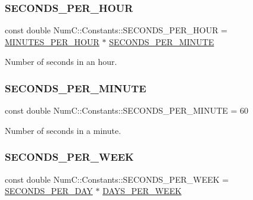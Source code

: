\subsubsection{\texorpdfstring{S\+E\+C\+O\+N\+D\+S\+\_\+\+P\+E\+R\+\_\+\+H\+O\+UR}{SECONDS\_PER\_HOUR}}
{\footnotesize\ttfamily const double Num\+C\+::\+Constants\+::\+S\+E\+C\+O\+N\+D\+S\+\_\+\+P\+E\+R\+\_\+\+H\+O\+UR = \mbox{\hyperlink{namespace_num_c_1_1_constants_ad866f0ac14005c8c3e2a09f396a3aab3}{M\+I\+N\+U\+T\+E\+S\+\_\+\+P\+E\+R\+\_\+\+H\+O\+UR}} $\ast$ \mbox{\hyperlink{namespace_num_c_1_1_constants_af8489b57825b7d3355fd0e3da0e4ad62}{S\+E\+C\+O\+N\+D\+S\+\_\+\+P\+E\+R\+\_\+\+M\+I\+N\+U\+TE}}}



Number of seconds in an hour. 

\mbox{\label{namespace_num_c_1_1_constants_af8489b57825b7d3355fd0e3da0e4ad62}} 
\subsubsection{\texorpdfstring{S\+E\+C\+O\+N\+D\+S\+\_\+\+P\+E\+R\+\_\+\+M\+I\+N\+U\+TE}{SECONDS\_PER\_MINUTE}}
{\footnotesize\ttfamily const double Num\+C\+::\+Constants\+::\+S\+E\+C\+O\+N\+D\+S\+\_\+\+P\+E\+R\+\_\+\+M\+I\+N\+U\+TE = 60}



Number of seconds in a minute. 

\mbox{\label{namespace_num_c_1_1_constants_abb1ba6ca939e4a4872c904e9cb624300}} 
\subsubsection{\texorpdfstring{S\+E\+C\+O\+N\+D\+S\+\_\+\+P\+E\+R\+\_\+\+W\+E\+EK}{SECONDS\_PER\_WEEK}}
{\footnotesize\ttfamily const double Num\+C\+::\+Constants\+::\+S\+E\+C\+O\+N\+D\+S\+\_\+\+P\+E\+R\+\_\+\+W\+E\+EK = \mbox{\hyperlink{namespace_num_c_1_1_constants_a0679151e1b64bb3d5a0d005893a4fe3e}{S\+E\+C\+O\+N\+D\+S\+\_\+\+P\+E\+R\+\_\+\+D\+AY}} $\ast$ \mbox{\hyperlink{namespace_num_c_1_1_constants_af5a30002b60b03726aa0049a6e065270}{D\+A\+Y\+S\+\_\+\+P\+E\+R\+\_\+\+W\+E\+EK}}}



